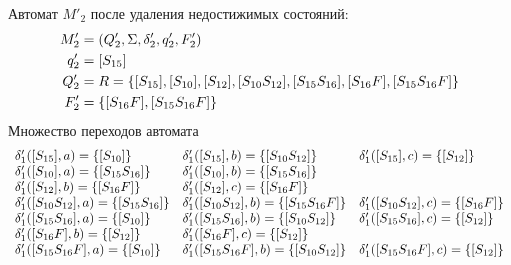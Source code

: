 Автомат \(M'_2\) после удаления недостижимых состояний:
\begin{align*}
	M'_2 & = (Q'_2, \Sigma, \delta'_2, q'_2, F'_2)                                                             \\
	q'_2 & = [S_{15}]                                                                                          \\
	Q'_2 & = R = \left\{[S_{15}],[S_{10}], [S_{12}], [S_{10}S_{12}], [S_{15}S_{16}], [S_{16}F], [S_{15}S_{16}F]\right\} \\
	F'_2 & = \left\{[S_{16}F], [S_{15}S_{16}F]\right\}
\end{align*}
Множество переходов автомата
\begin{align*}
	\begin{array}{lll}
		\delta'_1([S_{15}], a) = \left\{[S_{10}]\right\}             & \delta'_1([S_{15}], b) = \left\{[S_{10}S_{12}]\right\}        & \delta'_1([S_{15}], c) = \left\{[S_{12}]\right\}        \\
		\delta'_1([S_{10}], a) = \left\{[S_{15}S_{16}]\right\}       & \delta'_1([S_{10}], b) = \left\{[S_{15}S_{16}]\right\}                                                         \\
		\delta'_1([S_{12}], b) = \left\{[S_{16}F]\right\}            & \delta'_1([S_{12}], c) = \left\{[S_{16}F]\right\}                                                              \\
		\delta'_1([S_{10}S_{12}], a) = \left\{[S_{15}S_{16}]\right\} & \delta'_1([S_{10}S_{12}], b) = \left\{[S_{15}S_{16}F]\right\} & \delta'_1([S_{10}S_{12}], c) = \left\{[S_{16}F]\right\} \\
		\delta'_1([S_{15}S_{16}], a) = \left\{[S_{10}]\right\}       & \delta'_1([S_{15}S_{16}], b) = \left\{[S_{10}S_{12}]\right\}  & \delta'_1([S_{15}S_{16}], c) = \left\{[S_{12}]\right\}  \\
		\delta'_1([S_{16}F], b) = \left\{[S_{12}]\right\}            & \delta'_1([S_{16}F], c) = \left\{[S_{12}]\right\}                                                              \\
		\delta'_1([S_{15}S_{16}F], a) = \left\{[S_{10}]\right\}      & \delta'_1([S_{15}S_{16}F], b) = \left\{[S_{10}S_{12}]\right\} & \delta'_1([S_{15}S_{16}F], c) = \left\{[S_{12}]\right\} \\
	\end{array}
\end{align*}
